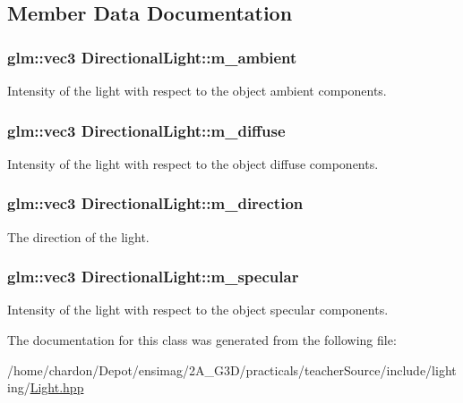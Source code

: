 \subsection{Member Data Documentation}
\hypertarget{classDirectionalLight_afaf3088136b72d8af8188526e410b53a}{
\subsubsection[{m\+\_\+ambient}]{\setlength{\rightskip}{0pt plus 5cm}glm\+::vec3 Directional\+Light\+::m\+\_\+ambient\hspace{0.3cm}{\ttfamily [private]}}}\label{classDirectionalLight_afaf3088136b72d8af8188526e410b53a}
Intensity of the light with respect to the object ambient components. \hypertarget{classDirectionalLight_aa9391a104441f2cb5cc56e976bcde89a}{
\subsubsection[{m\+\_\+diffuse}]{\setlength{\rightskip}{0pt plus 5cm}glm\+::vec3 Directional\+Light\+::m\+\_\+diffuse\hspace{0.3cm}{\ttfamily [private]}}}\label{classDirectionalLight_aa9391a104441f2cb5cc56e976bcde89a}
Intensity of the light with respect to the object diffuse components. \hypertarget{classDirectionalLight_a4432e8ebaa81b9fe4d033056eb19ca4c}{
\subsubsection[{m\+\_\+direction}]{\setlength{\rightskip}{0pt plus 5cm}glm\+::vec3 Directional\+Light\+::m\+\_\+direction\hspace{0.3cm}{\ttfamily [private]}}}\label{classDirectionalLight_a4432e8ebaa81b9fe4d033056eb19ca4c}
The direction of the light. \hypertarget{classDirectionalLight_a56e4161550e3eaa31d17c54cf108a028}{
\subsubsection[{m\+\_\+specular}]{\setlength{\rightskip}{0pt plus 5cm}glm\+::vec3 Directional\+Light\+::m\+\_\+specular\hspace{0.3cm}{\ttfamily [private]}}}\label{classDirectionalLight_a56e4161550e3eaa31d17c54cf108a028}
Intensity of the light with respect to the object specular components. 

The documentation for this class was generated from the following file\+:\begin{DoxyCompactItemize}
\item 
/home/chardon/\+Depot/ensimag/2\+A\+\_\+\+G3\+D/practicals/teacher\+Source/include/lighting/\hyperlink{Light_8hpp}{Light.\+hpp}\end{DoxyCompactItemize}
